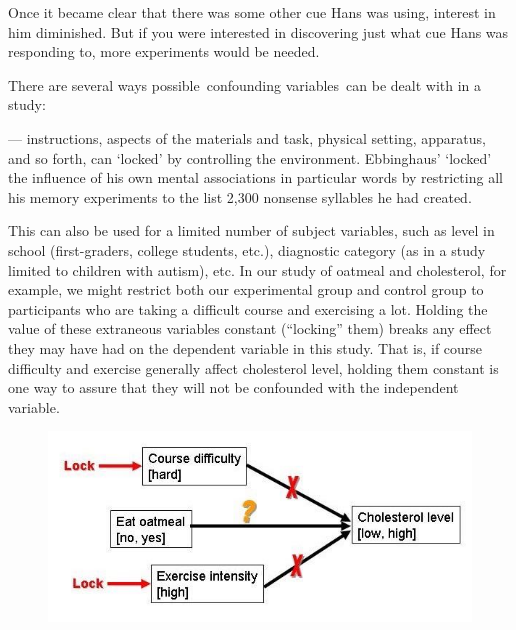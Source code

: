 \begin{refsection}
Once it became clear that there was some other cue Hans was using, interest in him diminished. But if you were interested in discovering just what cue Hans was responding to, more experiments would be needed. 

There are several ways possible confounding variables can be dealt with in a study:

 --- instructions, aspects of the materials and task, physical setting, apparatus, and so forth, can `locked' by controlling the environment. Ebbinghaus' `locked' the influence of his own mental associations in particular words by restricting all his memory experiments to the list 2,300 nonsense syllables he had created. 

This can also be used for a limited number of subject variables, such as level in school (first-graders, college students, etc.), diagnostic category (as in a study limited to children with autism), etc. In our study of oatmeal and cholesterol, for example, we might restrict both our experimental group and control group to participants who are taking a difficult course and exercising a lot. Holding the value of these extraneous variables constant (``locking'' them) breaks any effect they may have had on the dependent variable in this study. That is, if course difficulty and exercise generally affect cholesterol level, holding them constant is one way to assure that they will not be confounded with the independent variable.

\begin{figure}[htbp]
\centering
\includegraphics[keepaspectratio,width=\textwidth,height=0.75\textheight]{causaldiagramsexperimentsconstant.jpg}
\label{causaldiagramsexperimentsconstant.jpg}
\end{figure}


\end{refsection}
